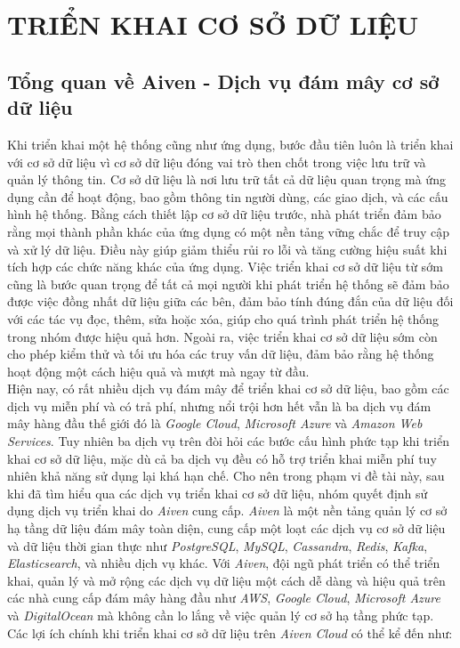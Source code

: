\section{TRIỂN KHAI CƠ SỞ DỮ LIỆU}
\subsection{Tổng quan về Aiven - Dịch vụ đám mây cơ sở dữ liệu}
\hspace*{1cm}
Khi triển khai một hệ thống cũng như ứng dụng, bước đầu tiên luôn là triển khai với cơ sở dữ liệu vì cơ sở dữ liệu đóng vai trò then chốt trong việc lưu trữ và quản lý thông tin. Cơ sở dữ liệu là nơi lưu trữ tất cả dữ liệu quan trọng mà ứng dụng cần để hoạt động, bao gồm thông tin người dùng, các giao dịch, và các cấu hình hệ thống. Bằng cách thiết lập cơ sở dữ liệu trước, nhà phát triển đảm bảo rằng mọi thành phần khác của ứng dụng có một nền tảng vững chắc để truy cập và xử lý dữ liệu. Điều này giúp giảm thiểu rủi ro lỗi và tăng cường hiệu suất khi tích hợp các chức năng khác của ứng dụng. Việc triển khai cơ sở dữ liệu từ sớm cũng là bước quan trọng để tất cả mọi người khi phát triển hệ thống sẽ đảm bảo được việc đồng nhất dữ liệu giữa các bên, đảm bảo tính đúng đắn của dữ liệu đối với các tác vụ đọc, thêm, sửa hoặc xóa, giúp cho quá trình phát triển hệ thống trong nhóm được hiệu quả hơn. Ngoài ra, việc triển khai cơ sở dữ liệu sớm còn cho phép kiểm thử và tối ưu hóa các truy vấn dữ liệu, đảm bảo rằng hệ thống hoạt động một cách hiệu quả và mượt mà ngay từ đầu.\\
\hspace*{1cm}
Hiện nay, có rất nhiều dịch vụ đám mây để triển khai cơ sở dữ liệu, bao gồm các dịch vụ miễn phí và có trả phí, nhưng nổi trội hơn hết vẫn là ba dịch vụ đám mây hàng đầu thế giới đó là \textit{Google Cloud}, \textit{Microsoft Azure} và \textit{Amazon Web Services}. Tuy nhiên ba dịch vụ trên đòi hỏi các bước cấu hình phức tạp khi triển khai cơ sở dữ liệu, mặc dù cả ba dịch vụ đều có hỗ trợ triển khai miễn phí tuy nhiên khả năng sử dụng lại khá hạn chế. Cho nên trong phạm vi đề tài này, sau khi đã tìm hiểu qua các dịch vụ triển khai cơ sở dữ liệu, nhóm quyết định sử dụng dịch vụ triển khai do \textit{Aiven} cung cấp. \textit{Aiven} là một nền tảng quản lý cơ sở hạ tầng dữ liệu đám mây toàn diện, cung cấp một loạt các dịch vụ cơ sở dữ liệu và dữ liệu thời gian thực như \textit{PostgreSQL}, \textit{MySQL}, \textit{Cassandra}, \textit{Redis}, \textit{Kafka}, \textit{Elasticsearch}, và nhiều dịch vụ khác. Với \textit{Aiven}, đội ngũ phát triển có thể triển khai, quản lý và mở rộng các dịch vụ dữ liệu một cách dễ dàng và hiệu quả trên các nhà cung cấp đám mây hàng đầu như \textit{AWS}, \textit{Google Cloud}, \textit{Microsoft Azure} và \textit{DigitalOcean} mà không cần lo lắng về việc quản lý cơ sở hạ tầng phức tạp. Các lợi ích chính khi triển khai cơ sở dữ liệu trên \textit{Aiven Cloud} có thể kể đến như:
